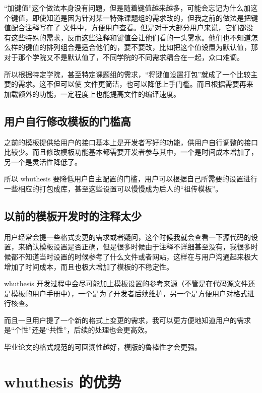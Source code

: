 “加键值”这个做法本身没有问题，但是随着键值越来越多，可能会忘记为什么加这个键值，即使知道是因为针对某一特殊课题组的需求改的，但我之前的做法是把键值配合注释写在了  文件中，方便用户查看。但是对于大部分用户来说，它们都没有这些特殊的需求，反而这些注释和键值会让他们看的一头雾水。他们也不知道怎么样的键值的排列组合是适合他们的，要不要改，比如把这个值设置为默认值，那对于那个学院又不是默认值了，不同学院的不同需求耦合在一起，众口难调。

所以根据特定学院，甚至特定课题组的需求，“将键值设置打包”就成了一个比较主要的需求。这不但可以使  文件更简洁，也可以降低上手门槛。而且根据需要再来加载额外的功能，一定程度上也能提高文件的编译速度。



\subsection{用户自行修改模板的门槛高}

之前的模板提供给用户的接口基本上是开发者写好的功能，供用户自行调整的接口比较少。而且修改模板功能基本都需要开发者参与其中，一个是时间成本增加了，另一个是灵活性降低了。

所以 whuthesis 要降低用户自主配置的门槛，用户可以根据自己所需要的设置进行一些相应的打包成库，甚至这些设置可以慢慢成为后人的“祖传模板”。


\subsection{以前的模板开发时的注释太少}

用户经常会提一些格式变更的需求或者疑问，这个时候我就会查看一下源代码的设置，来确认模板设置是否正确，但是很多时候由于注释不详细甚至没有，我很多时候都不知道当时设置的时候参考了什么文件或者网站，这样在与用户沟通起来极大增加了时间成本，而且也极大增加了模板的不稳定性。

whuthesis 开发过程中会尽可能加上模板设置的参考来源（不管是在代码源文件还是模板的用户手册中），一个是为了开发者后续维护，另一个是方便用户对格式进行核查。

而且一旦用户提了一个新的格式上变更的需求，我可以更方便地知道用户的需求是“个性”还是“共性”，后续的处理也会更高效。

毕业论文的格式规范的可回溯性越好，模版的鲁棒性才会更强。



\section{whuthesis 的优势}

